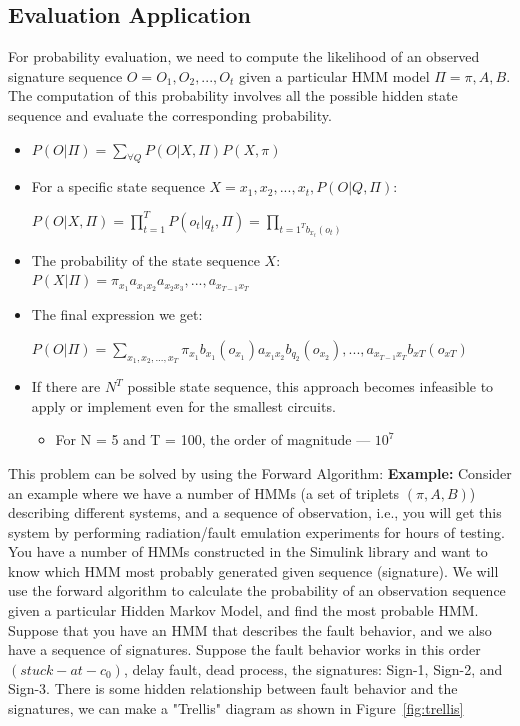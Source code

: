 \subsection{Evaluation Application}
For probability evaluation, we need to compute the likelihood of an observed signature sequence $O = {O_1, O_2,...,O_t}$ given a particular HMM model $ \Pi = {\pi, A, B}$. The computation of this probability involves all the possible hidden state sequence and evaluate the corresponding probability. 
\begin{itemize}
\item  $P(O | \Pi) = \sum\limits_{\forall Q}^{} P (O | X, \Pi) P (X, \pi)$ 
\item For a specific state sequence $X = {x_1, x_2,...,x_t}, P(O | Q, \Pi):$


 $P (O | X, \Pi) = \prod_{t=1}^{T} P (o_t | q_t, \Pi) = \prod_{t=1^{T} b_{x_t} (o_t)}$
 
 \item The probability of the state sequence $X$:
 \\
 \hspace {0.2cm} $ P (X | \Pi ) = \pi_{x_1} a_{x_1 x_2} a_{x_2 x_3},...,a_{x_{T-1} x_T}$
 
 \item The final expression we get:
 
$P (O | \Pi ) = \sum\limits_{x_1, x_2,..., x_T} \pi_{x_1} b_{x_1} (o_{x_1}) a_{x_1 x_2} b_{q_2} (o_{x_2}),..., a_{x_{T-1} x_T} b_{xT} (o_{xT})$
\item If there are $N^T$ possible state sequence, this approach becomes infeasible to apply or implement even for the smallest circuits.
\begin{itemize}
\item For N = 5 and T = 100, the order of magnitude --- $10^7$
\end{itemize}
 
\end{itemize}
This problem can be solved by using the Forward Algorithm:
\textbf{Example:} Consider an example where we have a number of HMMs (a set of triplets $(\pi, A, B)$) describing different systems, and a sequence of observation, i.e., you will get this system by performing radiation/fault emulation experiments for hours of testing. You have a number of HMMs constructed in the Simulink library and want to know which HMM most probably generated given sequence (signature).
We will use the forward algorithm to calculate the probability of an observation sequence given a particular Hidden Markov Model, and find the most probable HMM. Suppose that you have an HMM that describes the fault behavior, and we also have a sequence of signatures. Suppose the fault behavior works in this order $(stuck-at-c_0)$, delay fault, dead process, the signatures: Sign-1, Sign-2, and Sign-3. There is some hidden relationship between fault behavior and the signatures, we can make a "Trellis" diagram as shown in Figure~\ref{fig:trellis}
